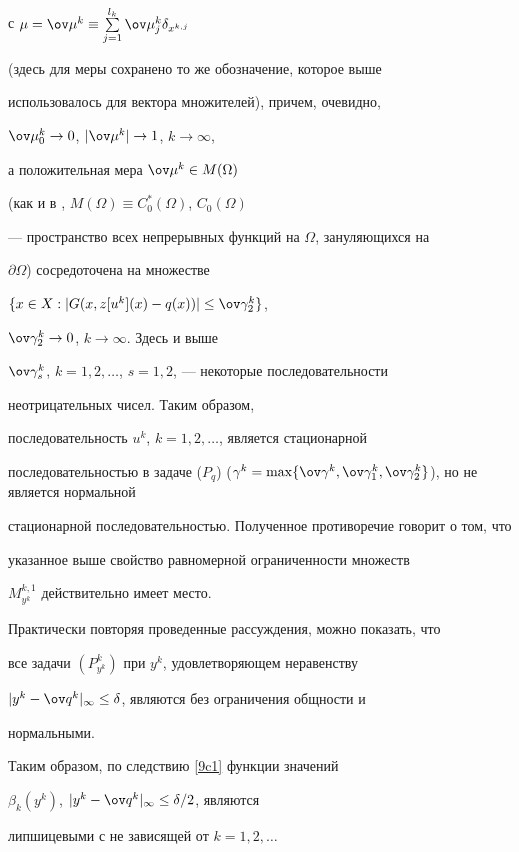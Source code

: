 с $\mu=\ov\mu^k\equiv\sum\limits_{j=1}^{l_k}


\ov\mu_j^k\delta_{x^{k,j}}$


(здесь для меры сохранено то же обозначение, которое выше


использовалось для вектора множителей), причем, очевидно,


$\ov\mu_0^k\to 0$, $|\ov\mu^k|\to 1$, $k\to\infty$,


а положительная мера $\ov\mu^k\in M(\Omega)$


(как и в \cite{sumin98}, $M(\Omega)\equiv C_0^*(\Omega)$, $C_0(\Omega)$


--- пространство всех непрерывных функций на $\Omega$, зануляющихся на


$\partial\Omega$) сосредоточена на множестве


$\{x\in X:|G(x,z[u^k](x)-q(x))|\leq\ov\gamma_2^k\}$,


$\ov\gamma_2^k\to 0$, $k\to\infty$. Здесь и выше


$\ov\gamma_s^k$, $k=1,2,\dotsc$, $s=1,2$, --- некоторые последовательности


неотрицательных чисел. Таким образом, 


последовательность $u^k$, $k=1,2,\dotsc$, является стационарной


последовательностью в задаче ($P_q$) ($\gamma^k=\max\{\ov\gamma^k,


\ov\gamma_1^k,\ov\gamma_2^k\}$), но не является нормальной


стационарной последовательностью. Полученное противоречие говорит о том, что


указанное выше свойство равномерной ограниченности множеств


${M_{y^k}^{k,1}}$ действительно имеет место.


Практически повторяя проведенные рассуждения, можно показать, что


все задачи $(P^k_{y^k})$ при $y^k$, удовлетворяющем неравенству


$|y^k-\ov q^k|_\infty\leq\delta$, являются без ограничения общности и


нормальными.





Таким образом, по следствию \ref{9c1} функции значений


$\beta_k(y^k)$, $|y^k-\ov q^k|_\infty\leq\delta/2$, являются


липшицевыми с не зависящей от $k=1,2,\dotsc$


